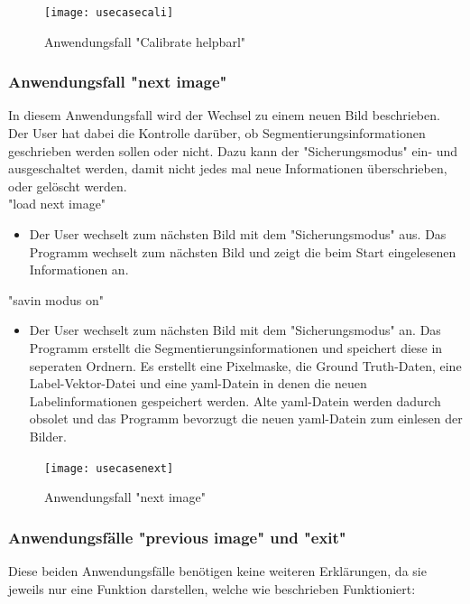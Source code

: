 \documentclass[11pt]{scrartcl}
\begin{document}
\begin{figure}[H]
  \texttt{[image: usecasecali]}
  \caption{Anwendungsfall "Calibrate helpbarl"}
\end{figure}

\subsubsection{Anwendungsfall "next image"}
\label{sec:Anwendungsfall "next image"  }

In diesem Anwendungsfall wird der Wechsel zu einem neuen Bild beschrieben. Der User hat dabei die Kontrolle darüber, ob Segmentierungsinformationen geschrieben werden sollen oder nicht. Dazu kann der "Sicherungsmodus" ein- und ausgeschaltet werden, damit nicht jedes mal neue Informationen überschrieben, oder gelöscht werden.
\\

\noindent
"load next image"
\begin{itemize}
	\item Der User wechselt zum nächsten Bild mit dem "Sicherungsmodus" aus. Das Programm wechselt zum nächsten Bild und zeigt die beim Start eingelesenen Informationen an.
\end{itemize}

"savin modus on"
\begin{itemize}
	\item Der User wechselt zum nächsten Bild mit dem "Sicherungsmodus" an. Das Programm erstellt die Segmentierungsinformationen und speichert diese in seperaten Ordnern. Es erstellt eine Pixelmaske, die Ground Truth-Daten, eine Label-Vektor-Datei und eine yaml-Datein in denen die neuen Labelinformationen gespeichert werden. Alte yaml-Datein werden dadurch obsolet und das Programm bevorzugt die neuen yaml-Datein zum einlesen der Bilder.
\end{itemize}
\begin{figure}[H]
  \texttt{[image: usecasenext]}
  \caption{Anwendungsfall "next image"}
\end{figure}

\subsubsection{Anwendungsfälle "previous image" und "exit"}
\label{sec:Anwendungsfälle "previous image" und "exit"}

Diese beiden Anwendungsfälle benötigen keine weiteren Erklärungen, da sie jeweils nur eine Funktion darstellen, welche wie beschrieben Funktioniert:
\\
\end{document}
